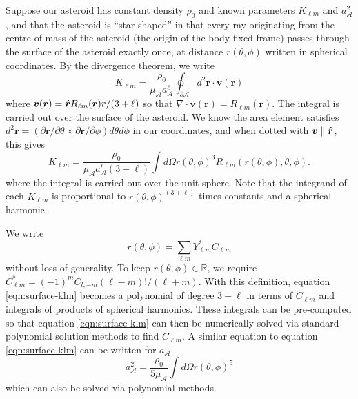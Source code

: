 Suppose our asteroid has constant density $\rho_0$ and known parameters $K_{\ell m}$ and $a_\mathcal{A}^2$, and that the asteroid is ``star shaped'' in that every ray originating from the centre of mass of the asteroid (the origin of the body-fixed frame) passes through the surface of the asteroid exactly once, at distance $r(\theta, \phi)$ written in spherical coordinates. By the divergence theorem, we write
\begin{equation}
  K_{\ell m} = \frac{\rho_0}{\mu_\mathcal{A} a_\mathcal{A}^\ell} \oint_{\partial \mathcal{A}} d^2 \bm r \cdot \bm v (\bm r)
\end{equation}
where $\bm v (\bm r) = \bm{\hat{r}} R_{\ell m} (\bm r) r / (3+\ell) $ so that $\nabla \cdot \bm v(\bm r) = R_{\ell m}(\bm r)$. The integral is carried out over the surface of the asteroid. We know the area element satisfies $d^2 \bm r = (\partial \bm r / \partial \theta \times \partial \bm r / \partial \phi) d\theta d\phi$ in our coordinates, and when dotted with $\bm v \parallel \bm{\hat{r}}$, this gives
\begin{equation}
  K_{\ell m} = \frac{\rho_0 }{\mu_\mathcal{A} a_\mathcal{A}^\ell (3 + \ell)} \int d\Omega r(\theta, \phi)^3 R_{\ell m}(r(\theta, \phi), \theta, \phi).
  \label{eqn:surface-klm}
\end{equation}
where the integral is carried out over the unit sphere. Note that the integrand of each $K_{\ell m}$ is proportional to $r(\theta, \phi)^{(3+\ell)}$ times constants and a spherical harmonic.

We write 
\begin{equation}
  r(\theta, \phi) = \sum_{\ell m} Y_{\ell m}^* C_{\ell m}
\end{equation}
without loss of generality. To keep $r(\theta, \phi) \in \mathds{R}$, we require $C_{\ell m}^* = (-1)^m C_{l,-m} (\ell-m)!/(\ell+m)$. With this definition, equation \ref{eqn:surface-klm} becomes a polynomial of degree $3+\ell$ in terms of $C_{\ell m}$ and integrals of products of spherical harmonics. These integrals can be pre-computed so that equation \ref{eqn:surface-klm} can then be numerically solved via standard polynomial solution methods to find $C_{\ell m}$. A similar equation to equation \ref{eqn:surface-klm} can be written for $a_\mathcal{A}$
\begin{equation}
  a_\mathcal{A}^2 = \frac{\rho_0}{5\mu_\mathcal{A}}\int d\Omega r(\theta, \phi)^5
  \label{eqn:surface-am}
\end{equation}
which can also be solved via polynomial methods.

